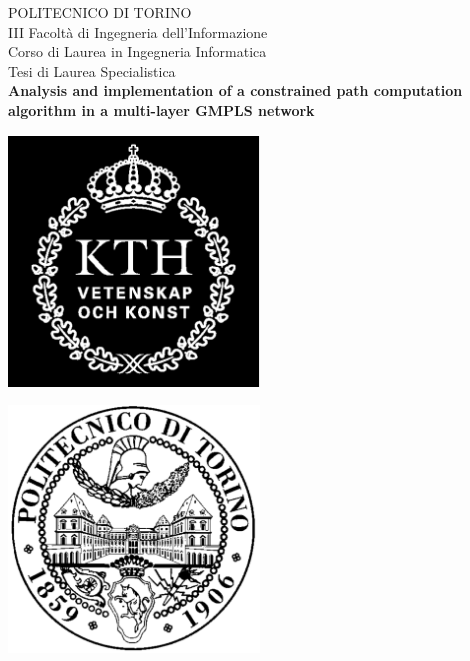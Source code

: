 \documentclass[10pt,a4paper]{report}
\begin{document}

\begin{titlepage}
\begin{center}

\LARGE{POLITECNICO DI TORINO}\\[1cm]

\LARGE{III Facoltà di Ingegneria dell’Informazione}\\
\large{Corso di Laurea in Ingegneria Informatica}\\[1.5cm]

\LARGE{Tesi di Laurea Specialistica}\\[1.5cm]

\LARGE{\textbf{Analysis and implementation of a constrained path
    computation algorithm in a multi-layer GMPLS network}}\\[1.5cm]

\noindent\begin{minipage}{.45\textwidth}
  \centering
  \includegraphics[width=0.5\textwidth]{./logokth}
\end{minipage}
\begin{minipage}{.45\textwidth}
  \centering
  \includegraphics[width=0.5\textwidth]{./logopolito}     
\end{minipage}\\[1.5cm]


\end{center}
\end{titlepage}
\end{document}
